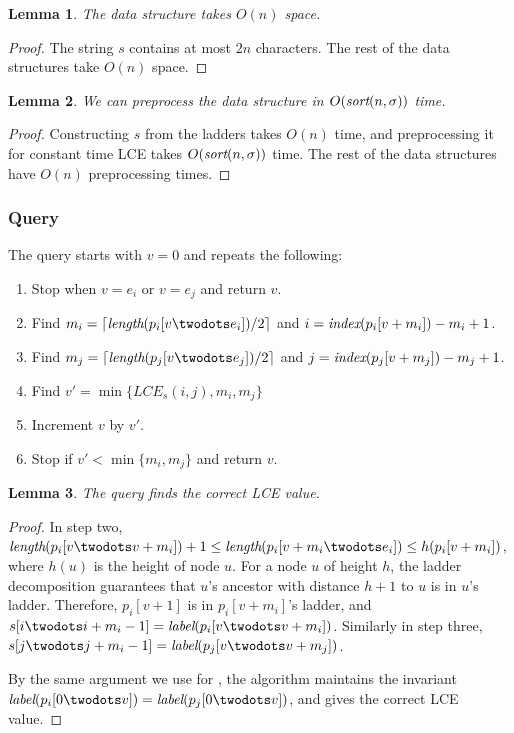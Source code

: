 \documentclass[a4]{article}
\newtheorem{lemma}{Lemma}
\begin{document}
\begin{lemma}
The  data structure takes $O(n)$ space.
\end{lemma}
\begin{proof}
The string $s$ contains at most $2n$ characters. The rest of the data structures take $O(n)$ space.
\end{proof}

\begin{lemma}
We can preprocess the  data structure in $O(\textit{sort}(n,\sigma))$ time.
\end{lemma}
\begin{proof}
Constructing $s$ from the ladders takes $O(n)$ time, and preprocessing it for constant time LCE takes $O(\textit{sort}(n,\sigma))$ time. The rest of the data structures have $O(n)$ preprocessing times.
\end{proof}

\subsubsection{Query}

The  query starts with $v=0$ and repeats the following:
\begin{enumerate}
\item Stop when $v = e_i$ or $v = e_j$ and return $v$.
\item Find $m_i = \lceil\zlength(p_i[v\twodots e_i])/2\rceil$ and $i = \textit{index}(p_i[v+m_i]) - m_i + 1$.
\item Find $m_j = \lceil\zlength(p_j[v\twodots e_j])/2\rceil$ and $j = \textit{index}(p_j[v+m_j]) - m_j + 1$.
\item Find $v' = \min\{LCE_s(i,j),m_i,m_j\}$
\item Increment $v$ by $v'$.
\item Stop if $v' < \min\{m_i,m_j\}$ and return $v$.
\end{enumerate}

\begin{lemma}
The  query finds the correct LCE value.
\end{lemma}
\begin{proof}
In step two, $\zlength(p_i[v\twodots v+m_i]) +1 \leq \zlength(p_i[v+m_i\twodots e_i])\leq h(p_i[v+m_i])$, where $h(u)$ is the height of node $u$. For a node $u$ of height $h$, the ladder decomposition guarantees that $u$'s ancestor with distance $h+1$ to $u$ is in $u$'s ladder. Therefore, $p_i[v+1]$ is in $p_i[v+m_i]$'s ladder, and $s[i\twodots i+m_i-1] = \zlabel(p_i[v\twodots v+m_i])$. Similarly in step three, $s[j\twodots j+m_i-1]\\ = \zlabel(p_j[v\twodots v+m_j])$.

By the same argument we use for , the algorithm maintains the invariant $\zlabel(p_i[0\twodots v])=\zlabel(p_j[0\twodots v])$, and gives the correct LCE value.
\end{proof}
\end{document}
